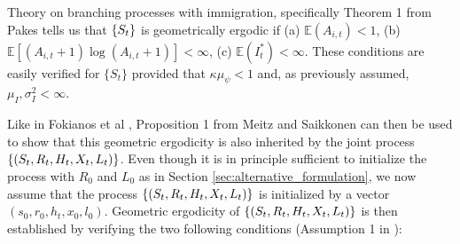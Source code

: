 \documentclass[review]{elsarticle}
\begin{document}
Theory on branching processes with immigration, specifically Theorem 1 from Pakes \cite{Pakes1971} tells us that $\{S_t\}$ is geometrically ergodic if (a) $\mathbb{E}(A_{i, t}) < 1$, (b) $\mathbb{E}[(A_{i, t} + 1)\log(A_{i, t} + 1)] < \infty$, (c) $\mathbb{E}(I^*_t) < \infty$. These conditions are easily verified for $\{S_t\}$ provided that $\kappa\mu_\psi < 1$ and, as previously assumed, $\mu_I, \sigma^2_I < \infty$.


Like in Fokianos et al \cite{Fokianos2009}, Proposition 1 from Meitz and Saikkonen \cite{Meitz2008} can then be used to show that this geometric ergodicity is also inherited by the joint process $\{(S_t, R_t, H_t, X_t, L_t)\}$. %
Even though it is in principle sufficient to initialize the process with $R_0$ and $L_0$ as in Section \ref{sec:alternative_formulation}, we now assume that the process $\{(S_t, R_t, H_t, X_t, L_t)\}$ is initialized by a vector $(s_0, r_0, h_t, x_0, l_0)$. Geometric ergodicity of $\{(S_t, R_t, H_t, X_t, L_t)\}$ is then established by verifying the two following conditions (Assumption 1 in \cite{Meitz2008}):
\end{document}
